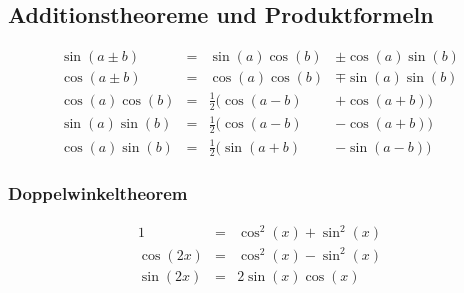 \subsection{Additionstheoreme und Produktformeln}
\begin{equation}
    \begin{aligned}
        \sin(a \pm b) &= &\sin(a) \cos(b) &\pm \cos(a) \sin(b) \\
        \cos(a \pm b) &= &\cos(a)\cos(b) &\mp \sin(a) \sin(b) \\
        \cos(a) \cos(b) &= &\frac{1}{2}(\cos(a-b) &+ \cos(a+b)) \\
        \sin(a) \sin(b) &= &\frac{1}{2}(\cos(a-b) &- \cos(a+b)) \\
        \cos(a) \sin(b) &= &\frac{1}{2}(\sin(a+b) &- \sin(a-b))
    \end{aligned}
\end{equation}
\subsubsection{Doppelwinkeltheorem}
\begin{equation}
    \begin{aligned}
        1 &= &\cos^2(x)+\sin^2(x) \\
        \cos(2x) &= &\cos^2(x)-\sin^2(x)\\
        \sin(2x) &= &2\sin(x)\cos(x)
    \end{aligned}
\end{equation}